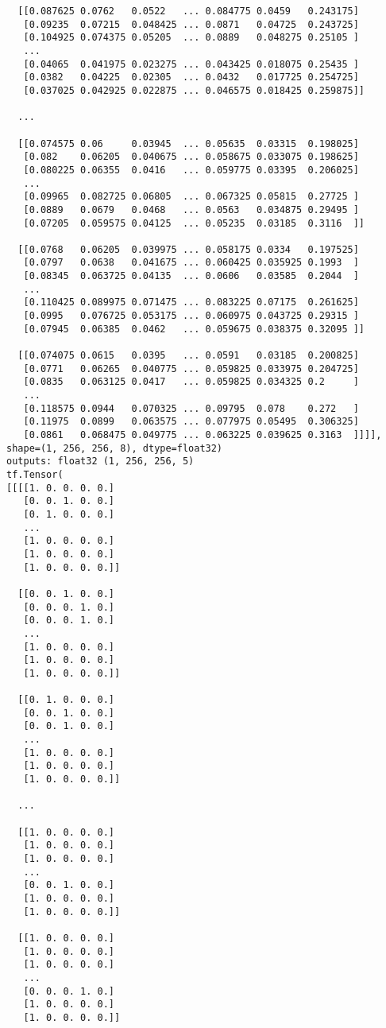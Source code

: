 \documentclass[
  letterpaper,
  DIV=11,
  numbers=noendperiod]{scrreprt}
\begin{document}
\begin{verbatim}
  [[0.087625 0.0762   0.0522   ... 0.084775 0.0459   0.243175]
   [0.09235  0.07215  0.048425 ... 0.0871   0.04725  0.243725]
   [0.104925 0.074375 0.05205  ... 0.0889   0.048275 0.25105 ]
   ...
   [0.04065  0.041975 0.023275 ... 0.043425 0.018075 0.25435 ]
   [0.0382   0.04225  0.02305  ... 0.0432   0.017725 0.254725]
   [0.037025 0.042925 0.022875 ... 0.046575 0.018425 0.259875]]

  ...

  [[0.074575 0.06     0.03945  ... 0.05635  0.03315  0.198025]
   [0.082    0.06205  0.040675 ... 0.058675 0.033075 0.198625]
   [0.080225 0.06355  0.0416   ... 0.059775 0.03395  0.206025]
   ...
   [0.09965  0.082725 0.06805  ... 0.067325 0.05815  0.27725 ]
   [0.0889   0.0679   0.0468   ... 0.0563   0.034875 0.29495 ]
   [0.07205  0.059575 0.04125  ... 0.05235  0.03185  0.3116  ]]

  [[0.0768   0.06205  0.039975 ... 0.058175 0.0334   0.197525]
   [0.0797   0.0638   0.041675 ... 0.060425 0.035925 0.1993  ]
   [0.08345  0.063725 0.04135  ... 0.0606   0.03585  0.2044  ]
   ...
   [0.110425 0.089975 0.071475 ... 0.083225 0.07175  0.261625]
   [0.0995   0.076725 0.053175 ... 0.060975 0.043725 0.29315 ]
   [0.07945  0.06385  0.0462   ... 0.059675 0.038375 0.32095 ]]

  [[0.074075 0.0615   0.0395   ... 0.0591   0.03185  0.200825]
   [0.0771   0.06265  0.040775 ... 0.059825 0.033975 0.204725]
   [0.0835   0.063125 0.0417   ... 0.059825 0.034325 0.2     ]
   ...
   [0.118575 0.0944   0.070325 ... 0.09795  0.078    0.272   ]
   [0.11975  0.0899   0.063575 ... 0.077975 0.05495  0.306325]
   [0.0861   0.068475 0.049775 ... 0.063225 0.039625 0.3163  ]]]], shape=(1, 256, 256, 8), dtype=float32)
outputs: float32 (1, 256, 256, 5)
tf.Tensor(
[[[[1. 0. 0. 0. 0.]
   [0. 0. 1. 0. 0.]
   [0. 1. 0. 0. 0.]
   ...
   [1. 0. 0. 0. 0.]
   [1. 0. 0. 0. 0.]
   [1. 0. 0. 0. 0.]]

  [[0. 0. 1. 0. 0.]
   [0. 0. 0. 1. 0.]
   [0. 0. 0. 1. 0.]
   ...
   [1. 0. 0. 0. 0.]
   [1. 0. 0. 0. 0.]
   [1. 0. 0. 0. 0.]]

  [[0. 1. 0. 0. 0.]
   [0. 0. 1. 0. 0.]
   [0. 0. 1. 0. 0.]
   ...
   [1. 0. 0. 0. 0.]
   [1. 0. 0. 0. 0.]
   [1. 0. 0. 0. 0.]]

  ...

  [[1. 0. 0. 0. 0.]
   [1. 0. 0. 0. 0.]
   [1. 0. 0. 0. 0.]
   ...
   [0. 0. 1. 0. 0.]
   [1. 0. 0. 0. 0.]
   [1. 0. 0. 0. 0.]]

  [[1. 0. 0. 0. 0.]
   [1. 0. 0. 0. 0.]
   [1. 0. 0. 0. 0.]
   ...
   [0. 0. 0. 1. 0.]
   [1. 0. 0. 0. 0.]
   [1. 0. 0. 0. 0.]]


\end{verbatim}
\end{document}
